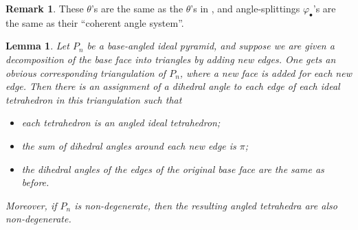 \documentclass[11pt]{amsart}
\newcommand{\vphi}{\varphi}
\theoremstyle{plain}
\newtheorem{lemma}[theorem]{Lemma}
\theoremstyle{definition}
\newtheorem{remark}[theorem]{Remark}
\begin{document}
\begin{remark}
These $\theta$'s are the same as the $\theta$'s in
\cite{BandS},
and angle-splittings $\vphi_\bullet$'s
are the same as their ``coherent angle system''.
\end{remark}



\begin{lemma}
\label{l:pyramid_decomp}
Let $P_n$ be a base-angled ideal pyramid, and suppose we are given a
decomposition of the base face into triangles by adding new edges.  One gets an
obvious corresponding triangulation of $P_n$, where a new face is added for each
new edge. Then there is an assignment of a dihedral angle to each edge of each
ideal tetrahedron in this triangulation such that
\begin{itemize}
\item each tetrahedron is an angled ideal tetrahedron;
\item the sum of dihedral angles around each new edge is $\pi$;
\item the dihedral angles of the edges of the original base face are the same as
	before.
\end{itemize} 
Moreover, if $P_n$ is non-degenerate,
then the resulting angled tetrahedra are also non-degenerate.
\end{lemma}
\end{document}
